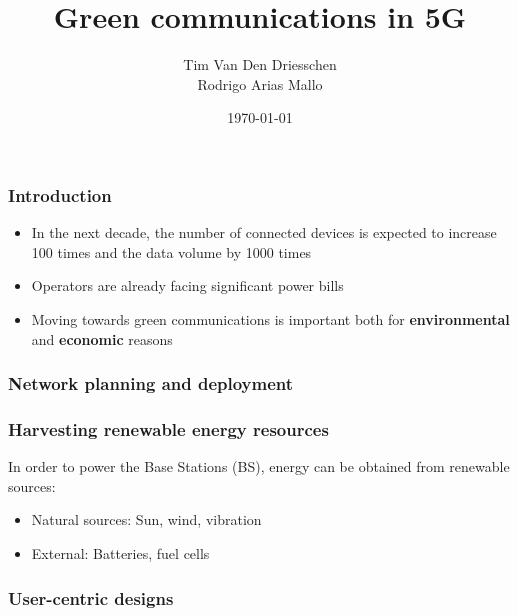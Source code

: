 \documentclass[a4paper,12pt,handout]{beamer}
\title{Green communications in 5G}
\author{Tim Van Den Driesschen\\Rodrigo Arias Mallo}
\institute{Universitat Politècnica de Catalunya}
\date{\today}
\begin{document}
\begin{frame}
	\titlepage
\end{frame}
\note{}
\begin{frame}
\frametitle{Introduction}
\begin{itemize}

\item In the next decade, the number of connected devices is expected to 
increase 100 times and the data volume by 1000 times

\item Operators are already facing significant power bills

\item Moving towards green communications is important both for 
\textbf{environmental} and \textbf{economic} reasons

\end{itemize}
\end{frame}
\note{}
\begin{frame}
	\frametitle{Network planning and deployment}
\end{frame}
\note{}
\begin{frame}
\frametitle{Harvesting renewable energy resources}
In order to power the Base Stations (BS), energy can be obtained from renewable 
sources:

\begin{itemize}
\item Natural sources: Sun, wind, vibration
\item External: Batteries, fuel cells
\end{itemize}
\end{frame}
\begin{frame}
	\frametitle{User-centric designs}
\end{frame}
\note{}
\end{document}
